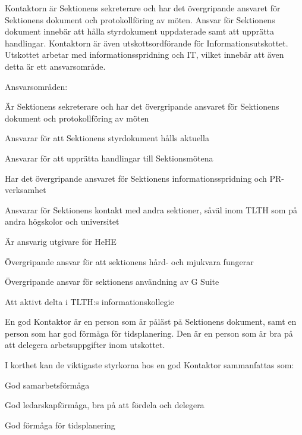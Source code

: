 \documentclass[10pt]{article}
\def\post{Kontaktor}
\def\doctitle{Kravprofil för \post}
\begin{document}
    \heading{\doctitle}
    
    
    Kontaktorn är Sektionens sekreterare och har det övergripande ansvaret för Sektionens dokument och
    protokollföring av möten. Ansvar för Sektionens dokument innebär att hålla styrdokument
    uppdaterade samt att upprätta handlingar. Kontaktorn är även utskottsordförande för
    Informationsutskottet. Utskottet arbetar med informationsspridning och IT, vilket
    innebär att även detta är ett ansvarsområde.
    
    Ansvarsområden:
    \begin{dashlist}
        \item Är Sektionens sekreterare och har det övergripande ansvaret för Sektionens dokument och
        protokollföring av möten
        \item Ansvarar för att Sektionens styrdokument hålls aktuella
        \item Ansvarar för att upprätta handlingar till Sektionsmötena
        \item Har det övergripande ansvaret för Sektionens informationsspridning och PR-verksamhet
        \item Ansvarar för Sektionens kontakt med andra sektioner, såväl inom TLTH som på andra
        högskolor och universitet
        \item Är ansvarig utgivare för HeHE
        \item Övergripande ansvar för att sektionens hård- och mjukvara fungerar 
        \item Övergripande ansvar för sektionens användning av G Suite 
        \item Att aktivt delta i TLTH:s informationskollegie
    \end{dashlist}
    
    En god Kontaktor är en person som är påläst på Sektionens dokument, samt en person som
    har god förmåga för tidsplanering. Den är en person som är bra på att delegera
    arbetsuppgifter inom utskottet. 
    
    I korthet kan de viktigaste styrkorna hos en god {\post} sammanfattas som:
    \begin{dashlist}
        \item God samarbetsförmåga
        \item God ledarskapförmåga, bra på att fördela och delegera
        \item God förmåga för tidsplanering
    \end{dashlist}
    
\end{document}
